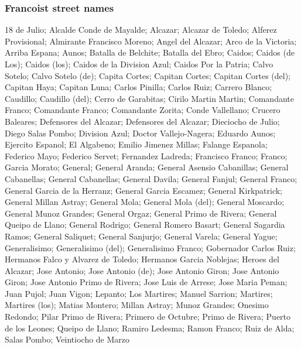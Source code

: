 \documentclass[aspectratio=43]{beamer}
\begin{document}
\begin{frame}
\frametitle{Francoist street names}
\centering

{\tiny 18 de Julio; Alcalde Conde de Mayalde; Alcazar; Alcazar de Toledo; Alferez Provisional; Almirante Francisco Moreno; Angel del Alcazar; Arco de la Victoria; Arriba Espana; Aunos; Batalla de Belchite; Batalla del Ebro; Caidos; Caidos (de Los); Caidos (los); Caidos de la Division Azul; Caidos Por la Patria; Calvo Sotelo; Calvo Sotelo (de); Capita Cortes; Capitan Cortes; Capitan Cortes (del); Capitan Haya; Capitan Luna; Carlos Pinilla; Carlos Ruiz; Carrero Blanco; Caudillo; Caudillo (del); Cerro de Garabitas; Cirilo Martin Martin; Comandante Franco; Comandante Franco; Comandante Zorita; Conde Vallellano; Crucero Baleares; Defensores del Alcazar; Defensores del Alcazar; Dieciocho de Julio; Diego Salas Pombo; Division Azul; Doctor Vallejo-Nagera; Eduardo Aunos; Ejercito Espanol; El Algabeno; Emilio Jimenez Millas; Falange Espanola; Federico Mayo; Federico Servet; Fernandez Ladreda; Francisco Franco; Franco; Garcia Morato; General; General Aranda; General Asensio Cabanillas; General Cabanellas; General Cabanellas; General Davila; General Fanjul; General Franco; General Garcia de la Herranz; General Garcia Escamez; General Kirkpatrick; General Millan Astray; General Mola; General Mola (del); General Moscardo; General Munoz Grandes; General Orgaz; General Primo de Rivera; General Queipo de Llano; General Rodrigo; General Romero Basart; General Sagardia Ramos; General Saliquet; General Sanjurjo; General Varela; General Yague; Generalisimo; Generalisimo (del); Generalisimo Franco; Gobernador Carlos Ruiz; Hermanos Falco y Alvarez de Toledo; Hermanos Garcia Noblejas; Heroes del Alcazar; Jose Antonio; Jose Antonio (de); Jose Antonio Giron; Jose Antonio Giron; Jose Antonio Primo de Rivera; Jose Luis de Arrese; Jose Maria Peman; Juan Pujol; Juan Vigon; Lepanto; Los Martires; Manuel Sarrion; Martires; Martires (los); Matias Montero; Millan Astray; Munoz Grandes; Onesimo Redondo; Pilar Primo de Rivera; Primero de Octubre; Primo de Rivera; Puerto de los Leones; Queipo de Llano; Ramiro Ledesma; Ramon Franco; Ruiz de Alda; Salas Pombo; Veintiocho de Marzo}\\

\end{frame}
\end{document}

